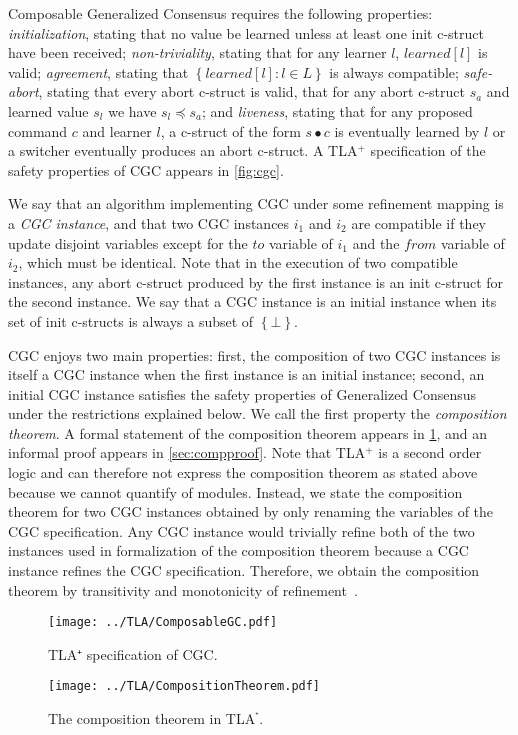 Composable Generalized Consensus requires the following properties: \emph{initialization}, stating that no value be learned unless at least one init c-struct have been received; \emph{non-triviality}, stating that for any learner $l$, $learned\left[ l \right]$ is valid; \emph{agreement}, stating that $\left\{ learned\left[ l \right] :  l \in L\right\}$ is always compatible; \emph{safe-abort}, stating that every abort c-struct is valid, that for any abort c-struct $s_a$ and learned value $s_l$ we have
$s_l \preceq s_a$; and \emph{liveness}, stating that for any proposed command $c$ and learner $l$, a c-struct of the form $s\bullet c$ is eventually learned by $l$ or a switcher eventually produces an abort c-struct.
A TLA$^+$ specification of the safety properties of CGC appears in \cref{fig:cgc}.

We say that an algorithm implementing CGC under some refinement mapping is a \emph{CGC instance}, and that two CGC instances $i_1$ and $i_2$ are compatible if they update disjoint variables except for the $to$ variable of $i_1$ and the $from$ variable of $i_2$, which must be identical.
Note that in the execution of two compatible instances, any abort c-struct produced by the first instance is an init c-struct for the second instance.
We say that a CGC instance is an initial instance when its set of init c-structs is always a subset of $\left\{ \bot \right\}$.   

CGC enjoys two main properties: first, the composition of two CGC instances is itself a CGC instance when the first instance is an initial instance; second, an initial CGC instance satisfies the safety properties of Generalized Consensus under the restrictions explained below.
We call the first property the \emph{composition theorem}.
A formal statement of the composition theorem appears in \cref{fig:compthm}, and an informal proof appears in \cref{sec:compproof}. 
Note that TLA$^+$ is a second order logic and can therefore not express the composition theorem as stated above because we cannot quantify of modules.
Instead, we state the composition theorem for two CGC instances obtained by only renaming the variables of the CGC specification.
Any CGC instance would trivially refine both of the two instances used in formalization of the composition theorem because a CGC instance refines the CGC specification.
Therefore, we obtain the composition theorem by transitivity and monotonicity of refinement~\cite{AbadiLamport91ExistenceRefinementMappings}.

\begin{figure}
\begin{minipage}[t]{.49\textwidth}
    \centering
    \texttt{[image: ../TLA/ComposableGC.pdf]}
    \caption{TLA$⁺$ specification of CGC.}\label{fig:cgc}%
\end{minipage}\hfill
\begin{minipage}[t]{.49\textwidth}
    \centering
    \texttt{[image: ../TLA/CompositionTheorem.pdf]}
    \caption{The composition theorem in TLA$^⁺$.}\label{fig:compthm}%
\end{minipage}
\end{figure}

